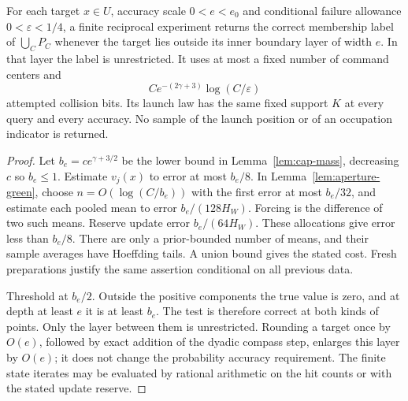\begin{proposition}
\label{prop:jitter-query}
For each target $x\in U$, accuracy scale $0<e<e_0$ and conditional
failure allowance $0<\varepsilon<1/4$, a finite reciprocal experiment
returns the correct membership label of $\bigcup_CP_C$ whenever the
target lies outside its inner boundary layer of width $e$. In that
layer the label is unrestricted. It uses at most a fixed number of
command centers and
\begin{equation}\label{eq:jitter-query-cost}
                    C e^{-(2\gamma+3)}\log(C/\varepsilon)
\end{equation}
attempted collision bits. Its launch law has the same fixed support
$K$ at every query and every accuracy. No sample of the launch position
or of an occupation indicator is returned.
\end{proposition}
\begin{proof}
Let $b_e=c e^{\gamma+3/2}$ be the lower bound in
Lemma~\ref{lem:cap-mass}, decreasing $c$ so $b_e\le1$.
Estimate $v_j(x)$ to error at most $b_e/8$. In
Lemma~\ref{lem:aperture-green}, choose
$n=O(\log(C/b_e))$ with the first error at most $b_e/32$, and
estimate each pooled mean to error $b_e/(128H_W)$. Forcing is the
difference of two such means. Reserve update error $b_e/(64H_W)$.
These allocations give error less than $b_e/8$. There are only a
prior-bounded number of means, and their sample averages have Hoeffding
tails. A union bound gives the stated cost. Fresh preparations justify
the same assertion conditional on all previous data.

Threshold at $b_e/2$. Outside the positive components the true value is
zero, and at depth at least $e$ it is at least $b_e$. The test is therefore
correct at both kinds of points. Only the layer between them is
unrestricted. Rounding a target once by $O(e)$, followed by exact
addition of the dyadic compass step, enlarges this layer by $O(e)$;
it does not change the probability accuracy requirement. The finite
state iterates may be evaluated by rational arithmetic on the hit
counts or with the stated update reserve.
\end{proof}

